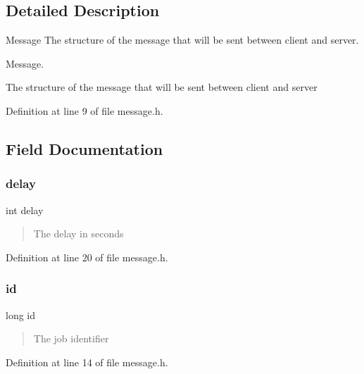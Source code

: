 \subsection{Detailed Description}
Message The structure of the message that will be sent between client and server. 

Message.

The structure of the message that will be sent between client and server 

Definition at line 9 of file message.\+h.



\subsection{Field Documentation}
\mbox{\label{structmsgbuf_a6f1be1f780ff54ec75b41451cd4d90bd}} 
\subsubsection{\texorpdfstring{delay}{delay}}
{\footnotesize\ttfamily int delay}



\begin{quote}
The delay in seconds \end{quote}




Definition at line 20 of file message.\+h.

\mbox{\label{structmsgbuf_a7350fbd6ad10618f3b750b1f99ca5c3c}} 
\subsubsection{\texorpdfstring{id}{id}}
{\footnotesize\ttfamily long id}



\begin{quote}
The job identifier \end{quote}




Definition at line 14 of file message.\+h.

\mbox{\label{structmsgbuf_af17b5de4074fb8cec910e0949474a81b}} 
